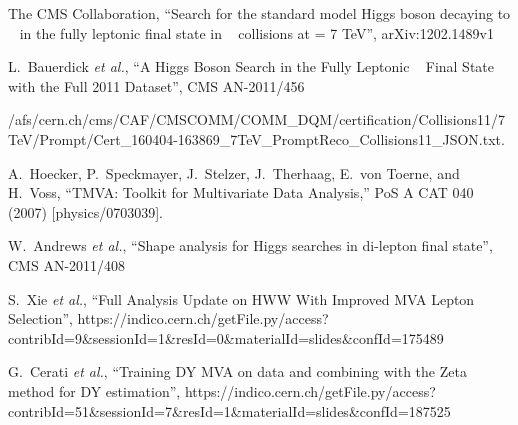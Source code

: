 \begin{thebibliography}{99}

  The CMS Collaboration, ``Search for the standard model Higgs boson decaying to \wwpm~ in the fully leptonic ﬁnal state in \PP~ collisions at \sqrts= 7 TeV'',
  arXiv:1202.1489v1 
     
  L.~Bauerdick {\it et al.}, ``A Higgs Boson Search in the Fully Leptonic \wwpm~ Final State with the Full 2011 Dataset'',
  CMS AN-2011/456 

  {\small
    /afs/cern.ch/cms/CAF/CMSCOMM/COMM\_DQM/certification/Collisions11/7TeV/Prompt/Cert\_160404-163869\_7TeV\_PromptReco\_Collisions11\_JSON.txt.
  }

   A.~Hoecker, P.~Speckmayer, J.~Stelzer, J.~Therhaag, E.~von Toerne, and H.~Voss, ``TMVA: Toolkit for Multivariate Data Analysis,''
   PoS A CAT 040 (2007) [physics/0703039].

  W.~Andrews {\it et al.}, ``Shape analysis for Higgs searches in di-lepton final state'',
  CMS AN-2011/408

  S.~Xie {\it et al.}, ``Full Analysis Update on HWW With Improved MVA Lepton Selection'', 
  {\footnotesize https://indico.cern.ch/getFile.py/access?contribId=9\&sessionId=1\&resId=0\&materialId=slides\&confId=175489}

  G.~Cerati {\it et al.}, ``Training DY MVA on data and combining with the Zeta method for DY estimation'', 
  {\footnotesize https://indico.cern.ch/getFile.py/access?contribId=51\&sessionId=7\&resId=1\&materialId=slides\&confId=187525}

\end{thebibliography}


